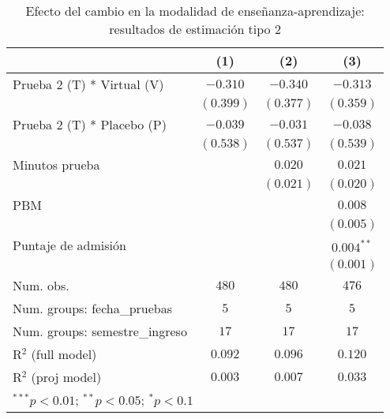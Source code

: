 
\begin{table}
\begin{center}
\begin{tabular}{l c c c}
\hline
 & (1) & (2) & (3) \\
\hline
Prueba 2 (T) * Virtual (V)     & $-0.310$  & $-0.340$  & $-0.313$     \\
                               & $(0.399)$ & $(0.377)$ & $(0.359)$    \\
Prueba 2 (T) * Placebo (P)     & $-0.039$  & $-0.031$  & $-0.038$     \\
                               & $(0.538)$ & $(0.537)$ & $(0.539)$    \\
Minutos prueba                 &           & $0.020$   & $0.021$      \\
                               &           & $(0.021)$ & $(0.020)$    \\
PBM                            &           &           & $0.008$      \\
                               &           &           & $(0.005)$    \\
Puntaje de admisión            &           &           & $0.004^{**}$ \\
                               &           &           & $(0.001)$    \\
\hline
Num. obs.                      & $480$     & $480$     & $476$        \\
Num. groups: fecha\_pruebas    & $5$       & $5$       & $5$          \\
Num. groups: semestre\_ingreso & $17$      & $17$      & $17$         \\
R$^2$ (full model)             & $0.092$   & $0.096$   & $0.120$      \\
R$^2$ (proj model)             & $0.003$   & $0.007$   & $0.033$      \\
\hline
\multicolumn{4}{l}{\scriptsize{$^{***}p<0.01$; $^{**}p<0.05$; $^{*}p<0.1$}}
\end{tabular}
\caption{Efecto del cambio en la modalidad de enseñanza-aprendizaje: resultados de estimación tipo 2}
\label{tab:regresiones_efectos_fijos_tipo2}
\end{center}
\end{table}

